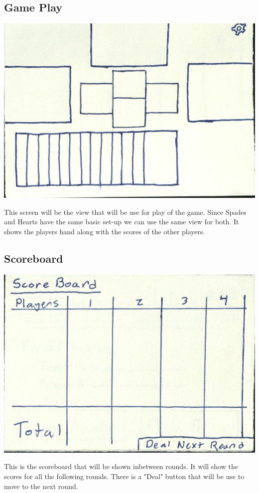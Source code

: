 \documentclass[]{scrartcl}
\begin{document}
\subsection{Game Play}
\centerline{\includegraphics{8.jpg}}
This screen will be the view that will be use for play of the game. Since Spades and Hearts have the same basic set-up we can use the same view for both. It shows the players hand along with the scores of the other players.

\subsection{Scoreboard}
\centerline{\includegraphics{9.jpg}}
This is the scoreboard that will be shown inbetween rounds. It will show the scores for all the following rounds. There is a "Deal" button that will be use to move to the next round.
\end{document}
